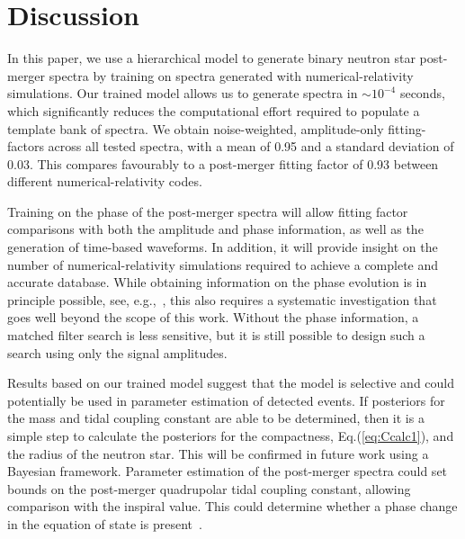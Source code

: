 \documentclass[../Thesis.tex]{subfiles}
\begin{document}
    \section{Discussion}
        In this paper, we use a hierarchical model to generate binary neutron star  post-merger spectra by training on spectra generated with numerical-relativity simulations. Our trained model allows us to generate spectra in ${\sim}10^{-4}$ seconds, which significantly reduces the computational effort required to populate a template bank of spectra. We obtain noise-weighted, amplitude-only fitting-factors across all tested spectra, with a mean of 0.95 and a standard deviation of 0.03. This compares favourably to a post-merger fitting factor of 0.93 between different numerical-relativity codes.\par
        Training on the phase of the post-merger spectra will allow fitting factor comparisons with both the amplitude and phase information, as well as the generation of time-based waveforms. In addition, it will provide insight on the number of numerical-relativity simulations required to achieve a complete and accurate database. While obtaining information on the phase evolution is in principle possible, see, e.g.,~\cite{Bose2018}, this also requires a systematic investigation that goes well beyond the scope of this work. Without the phase information, a matched filter search is less sensitive, but it is still possible to design such a search using only the signal amplitudes.
        \par
        Results based on our trained model suggest that the model is selective and could potentially be used in parameter estimation of detected events. If posteriors for the mass and tidal coupling constant are able to be determined, then it is a simple step to calculate the posteriors for the compactness, Eq.(\ref{eq:Ccalc1}), and the radius of the neutron star. This will be confirmed in future work using a Bayesian framework. Parameter estimation of the post-merger spectra could set bounds on the post-merger quadrupolar tidal coupling constant, allowing comparison with the inspiral value. This could determine whether a phase change in the equation of state is present~\cite{Bauswein2018,Most2018b}.\par
\end{document}
